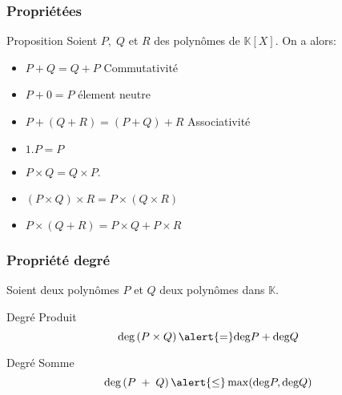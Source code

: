 \documentclass{beamer}
\newcommand{\setK}{\mathbb{K}}
\begin{document}
\begin{frame}[<+->]
  \frametitle{Propriétées}
 
  \begin{block}{Proposition }
    Soient $P,\;Q$ et  $R$ des polynômes de $\setK[X]$. On a alors:\\[4pt]
\small
    \begin{itemize}
      \item $P + Q = Q + P$ \scriptsize{\alert{Commutativité}}
      \item $P + 0 = P$ \scriptsize{\alert{élement neutre}}
      \item $P + \left(Q + R\right) = \left( P + Q\right) +
        R$ \scriptsize{\alert{Associativité}}
      \item $1.P = P$ 
      \item $P\times Q = Q\times P$.
      \item $\left(P\times Q\right)\times R = P\times \left(Q\times R\right)$
      \item $P\times\left( Q + R\right) = P\times Q + P\times R$
    \end{itemize}
  \end{block}
\end{frame}

\begin{frame}[t]
  \frametitle{Propriété degré}
 Soient deux polynômes $P$ et $Q$ deux polynômes dans $\setK$. 

 \begin{block}{Degré Produit}
  \begin{equation}
    \text{deg}\left(P\times Q\right) \alert{=} \text{deg} P + \text{deg} Q
  \end{equation} 
 \end{block}

 \pause
 \vspace*{1cm}

 \begin{block}{Degré Somme}
   \begin{equation}
     \text{deg}\left(P\;+\;Q\right)\alert{\leq} \max(\text{deg} P, \text{deg} Q)
 \end{equation}
 \end{block}

\end{frame}

\end{document}
